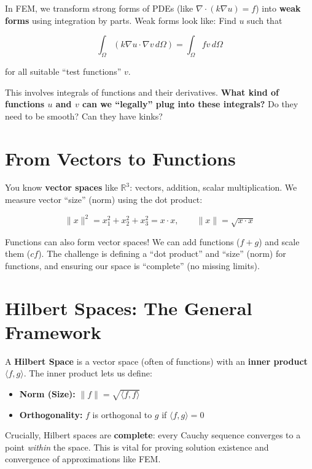 \documentclass[
  11pt,
  a4paper,
]{scrbook}
\providecommand{\tightlist}{%
  \setlength{\itemsep}{0pt}\setlength{\parskip}{0pt}}\usepackage{longtable,booktabs,array}
\begin{document}
In FEM, we transform strong forms of PDEs (like
\(\nabla\cdot(k\nabla u)=f\)) into \textbf{weak forms} using integration
by parts. Weak forms look like: Find \(u\) such that

\[
\int_{\Omega}(k\nabla u \cdot \nabla v\,d\Omega) = \int_{\Omega}fv \,d\Omega
\]

for all suitable ``test functions'' \(v\).

This involves integrals of functions and their derivatives. \textbf{What
kind of functions \(u\) and \(v\) can we ``legally'' plug into these
integrals?} Do they need to be smooth? Can they have kinks?

\section{From Vectors to Functions}\label{from-vectors-to-functions}

You know \textbf{vector spaces} like \(\mathbb{R}^3\): vectors,
addition, scalar multiplication. We measure vector ``size'' (norm) using
the dot product:

\[
\|x\|^2 = x_1^2 + x_2^2 + x_3^2 = x \cdot x, \qquad \|x\| = \sqrt{x \cdot x}
\]

Functions can also form vector spaces! We can add functions (\(f+g\))
and scale them (\(cf\)). The challenge is defining a ``dot product'' and
``size'' (norm) for functions, and ensuring our space is ``complete''
(no missing limits).

\section{Hilbert Spaces: The General
Framework}\label{hilbert-spaces-the-general-framework}

A \textbf{Hilbert Space} is a vector space (often of functions) with an
\textbf{inner product} \(\langle f,g \rangle\). The inner product lets
us define:

\begin{itemize}
\tightlist
\item
  \textbf{Norm (Size):} \(\|f\| = \sqrt{\langle f,f \rangle}\)
\item
  \textbf{Orthogonality:} \(f\) is orthogonal to \(g\) if
  \(\langle f,g \rangle = 0\)
\end{itemize}

Crucially, Hilbert spaces are \textbf{complete}: every Cauchy sequence
converges to a point \emph{within} the space. This is vital for proving
solution existence and convergence of approximations like FEM.
\end{document}
